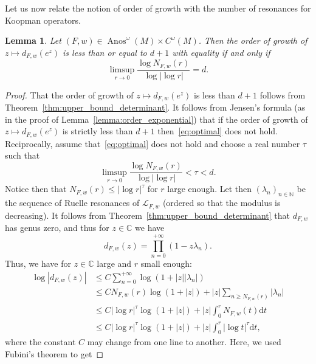 \documentclass[10pt]{amsart}
\newtheorem{lemm}[theo]{Lemma}\newtheorem{prop}[theo]{Proposition}\newtheorem{coro}[theo]{Corollary}\newtheorem{conj}[theo]{Conjecture}
\theoremstyle{definition}\newtheorem{defi}[theo]{Definition}\newtheorem{rema}[theo]{Remark}\newtheorem{exam}[theo]{Example}\newtheorem{exem}[theo]{Example}\newtheorem{nota}[theo]{Notation}
\DeclareMathOperator{\Anos}{Anos}
\newcommand{\clL}{\mathcal{L}}
\newcommand{\bbC}{\mathbb{C}}
\newcommand{\bbN}{\mathbb{N}}
\newcommand{\rmd}{\mathrm{d}}
\begin{document}
Let us now relate the notion of order of growth with the number of resonances for Koopman operators.

\begin{lemm}\label{lemma:optimal_order}
Let $(F,w) \in \Anos^\omega(M) \times C^\omega(M)$. Then the order of growth of $z \mapsto d_{F,w}(e^z)$ is less than or equal to $d+1$ with equality if and only if
\begin{equation}\label{eq:optimal}
\limsup_{r \to 0} \frac{\log N_{F,w}(r)}{\log |\log r|} = d.
\end{equation}
\end{lemm}

\begin{proof}
That the order of growth of $z \mapsto d_{F,w}(e^z)$ is less than $d+1$ follows from Theorem~\ref{thm:upper_bound_determinant}. It follows from Jensen's formula (as in the proof of Lemma~\ref{lemma:order_exponential}) that if the order of growth of $z \mapsto d_{F,w}(e^z)$ is strictly less than $d+1$ then~\eqref{eq:optimal} does not hold. Reciprocally, assume that~\eqref{eq:optimal} does not hold and choose a real number $\tau$ such that
\begin{equation*}
\limsup_{r \to 0} \frac{\log N_{F,w}(r)}{\log |\log r|} < \tau < d.
\end{equation*}
Notice then that $N_{F,w}(r) \leq |\log r|^\tau$ for $r$ large enough. Let then $(\lambda_n)_{n \in \bbN}$ be the sequence of Ruelle resonances of $\clL_{F,w}$ (ordered so that the modulus is decreasing). It follows from Theorem~\ref{thm:upper_bound_determinant} that $d_{F,w}$ has genus zero, and thus for $z \in \bbC$ we have
\begin{equation*}
d_{F,w}(z) = \prod_{n = 0}^{+ \infty} (1 - z \lambda_n).
\end{equation*}
Thus, we have for $z \in \bbC$ large and $r$ small enough:
\begin{equation*}
\begin{split}
\log |d_{F,w}(z)| & \leq C \sum_{n = 0}^{+ \infty} \log(1 + |z| |\lambda_n|) \\
& \leq C N_{F,w}(r) \log(1 + |z|) + |z| \sum_{n \geq N_{F,w}(r)}|\lambda_n| \\
& \leq C |\log r|^\tau \log(1 + |z|) + |z| \int_{0}^r N_{F,w}(t) \rmd t \\
& \leq C |\log r|^\tau \log(1 + |z|) + |z| \int_{0}^r |\log t|^\tau \rmd t,
\end{split}
\end{equation*}
where the constant $C$ may change from one line to another. Here, we used Fubini's theorem to get

\end{proof}
\end{document}
